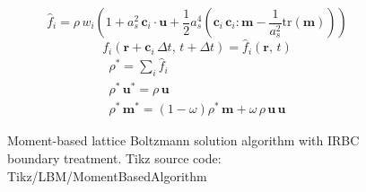 %
\begin{equation}\label{eq:Regularization}
    \widehat{f}_i = \rho \, w_i \left(1 + a_{s}^{2} \, \boldsymbol{c}_i \cdot \boldsymbol{u} + \frac{1}{2} a_{s}^{4} \left(\boldsymbol{c}_i \, \boldsymbol{c}_i : \boldsymbol{m} - \frac{1}{a_{s}^{2}} \mathrm{tr}\left(\boldsymbol{m}\right) \right) \right)
\end{equation}
%
\begin{equation}\label{eq:Streaming}
    f_i\left(\boldsymbol{r} + \boldsymbol{c}_i \, \Delta {t}, \, t + \Delta {t}\right) = \widehat{f}_i\left(\boldsymbol{r}, \, t\right)
\end{equation}
%
\begin{subequations}\label{eq:Collision}
\begin{gather}
    \rho^* = \sum_i \widehat{f}_i \\
    \rho^* \, \boldsymbol{u}^* = \rho \, \boldsymbol{u}
    \\
    \rho^* \, \boldsymbol{m}^* = \left(1 - \omega\right) \rho^* \, \boldsymbol{m} + \omega \, \rho \, \boldsymbol{u} \, \boldsymbol{u}
\end{gather}
\end{subequations}
%
\begin{figure}[hbt]
    \centering
    
    \caption{Moment-based lattice Boltzmann solution algorithm with IRBC boundary treatment. Tikz source code: Tikz/LBM/MomentBasedAlgorithm}
    \label{fig:MomentBasedAlgorithm}
\end{figure}
%
